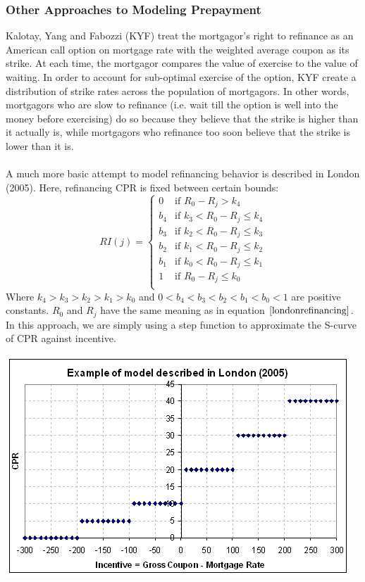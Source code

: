 \documentclass[10pt,letterpaper]{article}
\begin{document}
\subsubsection{Other Approaches to Modeling Prepayment}
Kalotay, Yang and Fabozzi (KYF) treat the mortgagor's right to refinance as an American call option on mortgage rate with the weighted average coupon as its strike.  At each time, the mortgagor compares the value of exercise to the value of waiting.  In order to account for sub-optimal exercise of the option, KYF create a distribution of strike rates across the population of mortgagors. In other words, mortgagors who are slow to refinance (i.e. wait till the option is well into the money before exercising) do so because they believe that the strike is higher than it actually is, while mortgagors who refinance too soon believe that the strike is lower than it is.\\
\\
A much more basic attempt to model refinancing behavior is described in London (2005).  Here, refinancing CPR is fixed between certain bounds:\\
\begin{equation}
\label{londonrefinancing}
RI(j) = 
\begin{cases} 
0 & \text{if $R_0 - R_j > k_4$}\\
b_4 & \text{if $k_3 < R_0 - R_j \leq k_4$}\\
b_3 & \text{if $k_2 < R_0 - R_j \leq k_3$}\\
b_2 & \text{if $k_1 < R_0 - R_j \leq k_2$}\\
b_1 & \text{if $k_0 < R_0 - R_j \leq k_1$}\\
1 & \text{if $R_0 - R_j \leq k_0$}\\
\end{cases} 
\end{equation}
Where $k_4 > k_3 > k_2 > k_1 > k_0$ and $0 < b_4 < b_3 < b_2 < b_1 < b_0 < 1$ are positive constants. $R_0$ and $R_j$ have the same meaning as in equation $\ref{londonrefinancing}$.  In this approach, we are simply using a step function to approximate the S-curve of CPR against incentive.\\
\begin{center}
\includegraphics[scale=0.7]{londonmodel.png}\\
\end{center}
\end{document}
